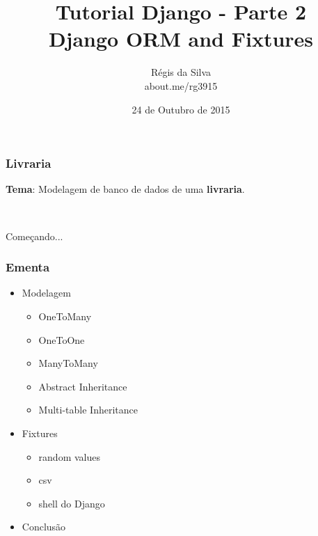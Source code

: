 \documentclass[aspectratio=169]{beamer}
\title{Tutorial Django - Parte 2\\ Django ORM and Fixtures}
\author{R\'egis da Silva\\ {\texorpdfstring{\color{blue}}{ }about.me/rg3915}}
\institute{\url{github.com/grupy-sp/encontros}}
\date{24 de Outubro de 2015}
\begin{document}
\justifying %

{%




\begin{frame}
	\titlepage
\end{frame}

\begin{frame}[fragile]\frametitle{Livraria}
	
\textbf{Tema}: Modelagem de banco de dados de uma \textbf{livraria}.

\

Começando...


\end{frame}

\begin{frame}\frametitle{Ementa}

\begin{itemize}
	\item Modelagem
	\begin{itemize}
		\item OneToMany
		\item OneToOne
		\item ManyToMany
		\item Abstract Inheritance
		\item Multi-table Inheritance
	\end{itemize}
	\item Fixtures
	\begin{itemize}
		\item random values
		\item csv
		\item shell do Django
	\end{itemize}
	\item Conclusão
\end{itemize}
	

\end{frame}}
\end{document}
